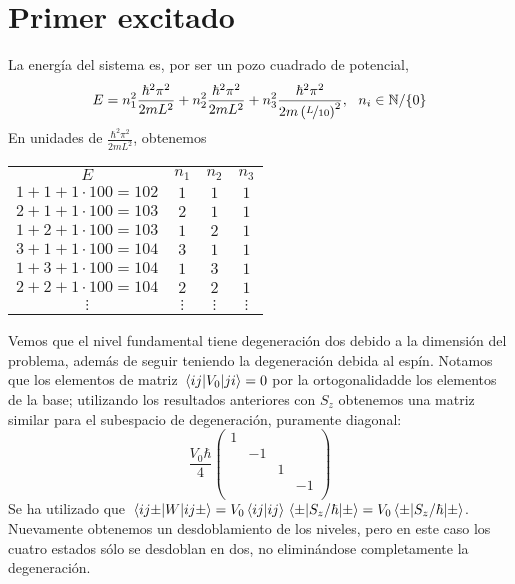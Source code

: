 \section*{Primer excitado}
La energía del sistema es, por ser un pozo cuadrado de potencial,
\begin{equation}
  E = n_1^2 \frac{\hbar^2\pi^2}{2mL^2} + n_2^2
  \frac{\hbar^2\pi^2}{2mL^2} + n_3^2 \frac{\hbar^2\pi^2}{2m \left(
      \nicefrac{L}{10} \right)^2}, \ \ n_i \in \mathbb{N}/\{0\}
\end{equation}
En unidades de $\frac{\hbar^2\pi^2}{2mL^2}$, obtenemos
\begin{center}
  \begin{tabular}{c|ccc}
    $E$&$n_1$&$n_2$&$n_3$ \\
    $1+1+1\cdot100=102$ & $1$ & $1$ & $1$ \\ \hline
    $2+1+1\cdot100=103$ & $2$ & $1$ & $1$ \\
    $1+2+1\cdot100=103$ & $1$ & $2$ & $1$ \\ \hline
    $3+1+1\cdot100=104$ & $3$ & $1$ & $1$ \\
    $1+3+1\cdot100=104$ & $1$ & $3$ & $1$ \\
    $2+2+1\cdot100=104$ & $2$ & $2$ & $1$ \\ \hline
    $\vdots$ & $\vdots$ & $\vdots$ & $\vdots$ \\ 
  \end{tabular}
\end{center}

Vemos que el nivel fundamental tiene degeneración dos debido a la
dimensión del problema, además de seguir teniendo la degeneración
debida al espín. Notamos que los elementos de matriz
$\mel{ij}{V_0}{ji}=0$ por la ortogonalidad\footnotemark  de los elementos de la
base; 
utilizando los resultados anteriores con $S_z$ obtenemos una
matriz similar para el subespacio de degeneración, puramente diagonal:
\begin{equation}
  \frac{V_0\hbar}{4}
  \begin{pmatrix}
    1 &   & &  \\
      & -1 & &  \\
      & &1&  \\
      & & &-1 \\
  \end{pmatrix}
\end{equation}
Se ha utilizado que
$\mel{ij\pm}{W}{ij\pm}=V_0\braket{ij}{ij}\mel{\pm}{S_z/\hbar}{\pm} =
V_0\mel{\pm}{S_z/\hbar}{\pm}$. Nuevamente obtenemos un desdoblamiento
de los niveles, pero en este caso los cuatro estados sólo se desdoblan
en dos, no eliminándose completamente la degeneración.

